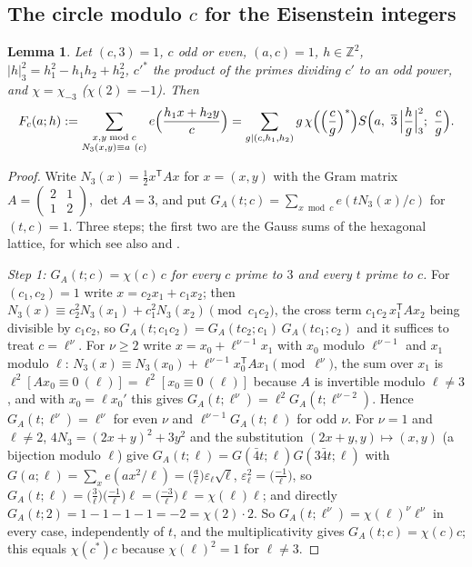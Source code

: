 \documentclass[11pt]{amsart}
\newtheorem{lemma}[theorem]{Lemma}
\theoremstyle{remark}
\newcommand{\Z}{\mathbb{Z}}
\begin{document}
\subsection{The circle modulo \texorpdfstring{$c$}{c} for the Eisenstein integers}
\begin{lemma}\label{lem:circle3}
Let $(c,3)=1$, $c$ odd or even, $(a,c)=1$, $h\in\Z^2$, $|h|_3^2=h_1^2-h_1h_2+h_2^2$, $c'^{*}$ the product of the primes dividing $c'$ to an odd power, and $\chi=\chi_{-3}$ ($\chi(2)=-1$). Then
\[
F_c(a;h):=\sum_{\substack{x,y\bmod c\\ N_3(x,y)\equiv a\ (c)}}e\Bigl(\frac{h_1x+h_2y}c\Bigr)=\sum_{g\mid(c,h_1,h_2)}g\,\chi\Bigl(\Bigl(\frac cg\Bigr)^{*}\Bigr)S\Bigl(a,\ \overline3\,\Bigl|\frac hg\Bigr|_3^2;\ \frac cg\Bigr).
\]
\end{lemma}
\begin{proof}
Write $N_3(x)=\frac12x^{\mathsf T}Ax$ for $x=(x,y)$ with the Gram matrix $A=\left(\begin{smallmatrix}2&1\\1&2\end{smallmatrix}\right)$, $\det A=3$, and put $G_A(t;c)=\sum_{x\bmod c}e(tN_3(x)/c)$ for $(t,c)=1$. Three steps; the first two are the Gauss sums of the hexagonal lattice, for which see also \cite[Chapter~1]{BEW} and \cite[Section~3.5]{IK}.

\emph{Step 1: $G_A(t;c)=\chi(c)\,c$ for every $c$ prime to $3$ and every $t$ prime to $c$.} For $(c_1,c_2)=1$ write $x=c_2x_1+c_1x_2$; then $N_3(x)\equiv c_2^2N_3(x_1)+c_1^2N_3(x_2)\pmod{c_1c_2}$, the cross term $c_1c_2\,x_1^{\mathsf T}Ax_2$ being divisible by $c_1c_2$, so $G_A(t;c_1c_2)=G_A(tc_2;c_1)\,G_A(tc_1;c_2)$ and it suffices to treat $c=\ell^\nu$. For $\nu\ge2$ write $x=x_0+\ell^{\nu-1}x_1$ with $x_0$ modulo $\ell^{\nu-1}$ and $x_1$ modulo $\ell$: $N_3(x)\equiv N_3(x_0)+\ell^{\nu-1}x_0^{\mathsf T}Ax_1\pmod{\ell^\nu}$, the sum over $x_1$ is $\ell^2[Ax_0\equiv0\ (\ell)]=\ell^2[x_0\equiv0\ (\ell)]$ because $A$ is invertible modulo $\ell\ne3$, and with $x_0=\ell x_0'$ this gives $G_A(t;\ell^\nu)=\ell^2G_A(t;\ell^{\nu-2})$. Hence $G_A(t;\ell^\nu)=\ell^\nu$ for even $\nu$ and $\ell^{\nu-1}G_A(t;\ell)$ for odd $\nu$. For $\nu=1$ and $\ell\ne2$, $4N_3=(2x+y)^2+3y^2$ and the substitution $(2x+y,y)\mapsto(x,y)$ (a bijection modulo $\ell$) give $G_A(t;\ell)=G(\bar4t;\ell)G(3\bar4t;\ell)$ with $G(a;\ell)=\sum_xe(ax^2/\ell)=\bigl(\frac a\ell\bigr)\varepsilon_\ell\sqrt\ell$, $\varepsilon_\ell^2=\bigl(\frac{-1}\ell\bigr)$, so $G_A(t;\ell)=\bigl(\frac3\ell\bigr)\bigl(\frac{-1}\ell\bigr)\ell=\bigl(\frac{-3}\ell\bigr)\ell=\chi(\ell)\ell$; and directly $G_A(t;2)=1-1-1-1=-2=\chi(2)\cdot2$. So $G_A(t;\ell^\nu)=\chi(\ell)^\nu\ell^\nu$ in every case, independently of $t$, and the multiplicativity gives $G_A(t;c)=\chi(c)c$; this equals $\chi(c^{*})c$ because $\chi(\ell)^2=1$ for $\ell\ne3$.


\end{proof}
\end{document}
